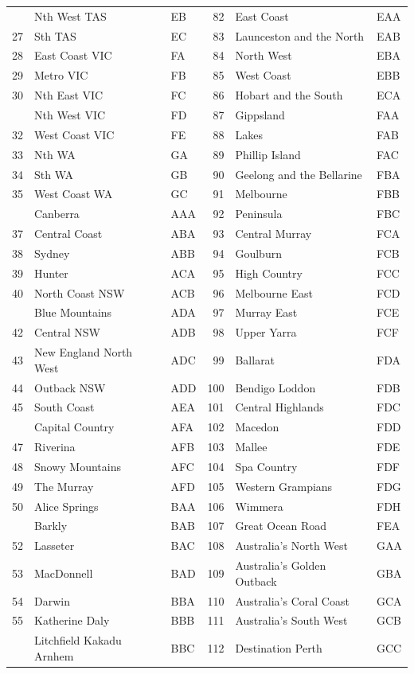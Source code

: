 \documentclass[
  11pt,
  letterpaper,
  DIV=11,
  numbers=noendperiod,
  titlepage]{scrartcl}
\begin{document}
\begin{longtable}[t]{rllrll}
\addlinespace
26 & Nth West TAS & EB & 82 & East Coast & EAA\\
27 & Sth TAS & EC & 83 & Launceston and the North & EAB\\
28 & East Coast VIC & FA & 84 & North West & EBA\\
29 & Metro VIC & FB & 85 & West Coast & EBB\\
30 & Nth East VIC & FC & 86 & Hobart and the South & ECA\\
\addlinespace
31 & Nth West VIC & FD & 87 & Gippsland & FAA\\
32 & West Coast VIC & FE & 88 & Lakes & FAB\\
33 & Nth WA & GA & 89 & Phillip Island & FAC\\
34 & Sth WA & GB & 90 & Geelong and the Bellarine & FBA\\
35 & West Coast WA & GC & 91 & Melbourne & FBB\\
\addlinespace
36 & Canberra & AAA & 92 & Peninsula & FBC\\
37 & Central Coast & ABA & 93 & Central Murray & FCA\\
38 & Sydney & ABB & 94 & Goulburn & FCB\\
39 & Hunter & ACA & 95 & High Country & FCC\\
40 & North Coast NSW & ACB & 96 & Melbourne East & FCD\\
\addlinespace
41 & Blue Mountains & ADA & 97 & Murray East & FCE\\
42 & Central NSW & ADB & 98 & Upper Yarra & FCF\\
43 & New England North West & ADC & 99 & Ballarat & FDA\\
44 & Outback NSW & ADD & 100 & Bendigo Loddon & FDB\\
45 & South Coast & AEA & 101 & Central Highlands & FDC\\
\addlinespace
46 & Capital Country & AFA & 102 & Macedon & FDD\\
47 & Riverina & AFB & 103 & Mallee & FDE\\
48 & Snowy Mountains & AFC & 104 & Spa Country & FDF\\
49 & The Murray & AFD & 105 & Western Grampians & FDG\\
50 & Alice Springs & BAA & 106 & Wimmera & FDH\\
\addlinespace
51 & Barkly & BAB & 107 & Great Ocean Road & FEA\\
52 & Lasseter & BAC & 108 & Australia's North West & GAA\\
53 & MacDonnell & BAD & 109 & Australia's Golden Outback & GBA\\
54 & Darwin & BBA & 110 & Australia's Coral Coast & GCA\\
55 & Katherine Daly & BBB & 111 & Australia's South West & GCB\\
\addlinespace
56 & Litchfield Kakadu Arnhem & BBC & 112 & Destination Perth & GCC\\
\bottomrule

\end{longtable}
\end{document}
